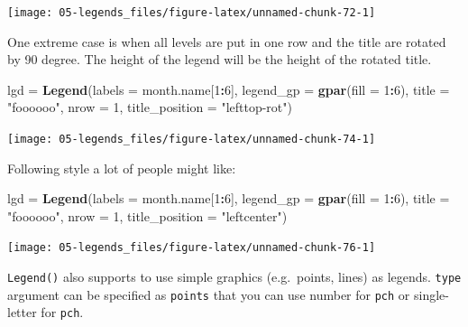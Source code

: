 \documentclass[]{book}
\newenvironment{Shaded}{\begin{snugshade}}{\end{snugshade}}
\newcommand{\KeywordTok}[1]{\textcolor[rgb]{0.13,0.29,0.53}{\textbf{#1}}}
\newcommand{\DataTypeTok}[1]{\textcolor[rgb]{0.13,0.29,0.53}{#1}}
\newcommand{\DecValTok}[1]{\textcolor[rgb]{0.00,0.00,0.81}{#1}}
\newcommand{\StringTok}[1]{\textcolor[rgb]{0.31,0.60,0.02}{#1}}
\newcommand{\OperatorTok}[1]{\textcolor[rgb]{0.81,0.36,0.00}{\textbf{#1}}}
\newcommand{\NormalTok}[1]{#1}
\theoremstyle{definition}
\theoremstyle{definition}
\theoremstyle{definition}
\theoremstyle{remark}
\begin{document}
\begin{center}\texttt{[image: 05-legends\_files/figure-latex/unnamed-chunk-72-1]} \end{center}

One extreme case is when all levels are put in one row and the title are
rotated by 90 degree. The height of the legend will be the height of the
rotated title.

\begin{Shaded}
\begin{Highlighting}[]
\NormalTok{lgd =}\StringTok{ }\KeywordTok{Legend}\NormalTok{(}\DataTypeTok{labels =}\NormalTok{ month.name[}\DecValTok{1}\OperatorTok{:}\DecValTok{6}\NormalTok{], }\DataTypeTok{legend_gp =} \KeywordTok{gpar}\NormalTok{(}\DataTypeTok{fill =} \DecValTok{1}\OperatorTok{:}\DecValTok{6}\NormalTok{), }\DataTypeTok{title =} \StringTok{"foooooo"}\NormalTok{, }
    \DataTypeTok{nrow =} \DecValTok{1}\NormalTok{, }\DataTypeTok{title_position =} \StringTok{"lefttop-rot"}\NormalTok{)}
\end{Highlighting}
\end{Shaded}

\begin{center}\texttt{[image: 05-legends\_files/figure-latex/unnamed-chunk-74-1]} \end{center}

Following style a lot of people might like:

\begin{Shaded}
\begin{Highlighting}[]
\NormalTok{lgd =}\StringTok{ }\KeywordTok{Legend}\NormalTok{(}\DataTypeTok{labels =}\NormalTok{ month.name[}\DecValTok{1}\OperatorTok{:}\DecValTok{6}\NormalTok{], }\DataTypeTok{legend_gp =} \KeywordTok{gpar}\NormalTok{(}\DataTypeTok{fill =} \DecValTok{1}\OperatorTok{:}\DecValTok{6}\NormalTok{), }\DataTypeTok{title =} \StringTok{"foooooo"}\NormalTok{, }
    \DataTypeTok{nrow =} \DecValTok{1}\NormalTok{, }\DataTypeTok{title_position =} \StringTok{"leftcenter"}\NormalTok{)}
\end{Highlighting}
\end{Shaded}

\begin{center}\texttt{[image: 05-legends\_files/figure-latex/unnamed-chunk-76-1]} \end{center}

\texttt{Legend()} also supports to use simple graphics (e.g.~points,
lines) as legends. \texttt{type} argument can be specified as
\texttt{points} that you can use number for \texttt{pch} or
single-letter for \texttt{pch}.
\end{document}
